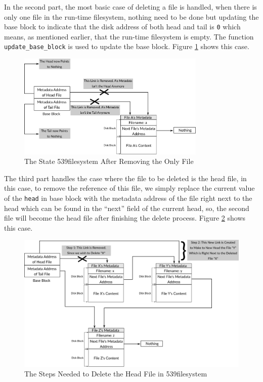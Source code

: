 In the second part, the most basic case of deleting a file is handled,
when there is only one file in the run-time filesystem, nothing need to
be done but updating the base block to indicate that the disk address of
both head and tail is \lstinline!0! which means, as mentioned earlier,
that the run-time filesystem is empty. The function
\lstinline!update_base_block! is used to update the base block. Figure
\ref{fig:delete_file_one_file_case} shows this case.

\begin{figure}
\centering
\includegraphics[width=0.80000\textwidth]{Figures/filesystem-ch/delete_file_one_file_case.png}
\caption{The State 539filesystem After Removing the Only
File}\label{fig:delete_file_one_file_case}
\end{figure}

The third part handles the case where the file to be deleted is the head
file, in this case, to remove the reference of this file, we simply
replace the current value of the \lstinline!head! in base block with the
metadata address of the file right next to the head which can be found
in the ``next'' field of the current head, so, the second file will
become the head file after finishing the delete process. Figure
\ref{fig:delete_file_head_case} shows this case.

\begin{figure}
\centering
\includegraphics[width=1.00000\textwidth]{Figures/filesystem-ch/delete_file_head_case.png}
\caption{The Steps Needed to Delete the Head File in
539filesystem}\label{fig:delete_file_head_case}
\end{figure}


